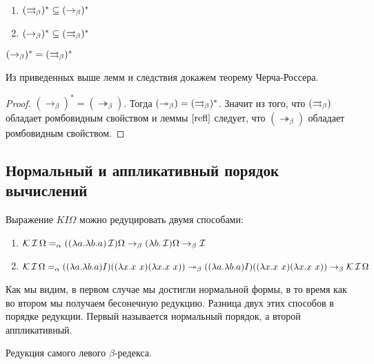 \begin{lemma}
	\
	\begin{enumerate}
		\item $(\rightrightarrows_{\beta} )^{*} \subseteq (\to_{\beta})^{*}$
		\item $(\to_{\beta})^{*} \subseteq (\rightrightarrows_{\beta} )^{*}$
	\end{enumerate}
\end{lemma}

\begin{cons}
	$(\to_{\beta})^{*}=(\rightrightarrows_{\beta} )^{*}$
\end{cons}

Из приведенных выше лемм и следствия докажем теорему Черча-Россера.

\begin{proof}
	$(\to_{\beta})^{*} = (\twoheadrightarrow_{\beta})$. Тогда $(\twoheadrightarrow_{\beta})=(\rightrightarrows_{\beta} )^{*}$. Значит из того, что $(\rightrightarrows_{\beta} )$ обладает ромбовидным свойством и леммы $\ref{refl}$ следует, что $(\twoheadrightarrow_{\beta})$ обладает ромбовидным свойством.
\end{proof}

\subsection{Нормальный и аппликативный порядок вычислений}

\begin{example}
	Выражение $KI\Omega$ можно редуцировать двумя способами:
	\begin{enumerate}
		\item $\operatorname{\mathcal{K}} \operatorname{\mathcal{I}} \Omega =_{\alpha} ((\lambda{}a.\lambda{}b.a) \operatorname{\mathcal{I}}) \Omega \to_{\beta} (\lambda{}b.\operatorname{\mathcal{I}})\Omega  \to_{\beta} \operatorname{\mathcal{I}}$
		\item  $\comb K \comb I \Omega =_{\alpha} ((\lambda{}a.\lambda{}b.a) I)((\lambda{}x.x \ x) (\lambda{}x.x \ x)) \twoheadrightarrow_{\beta} ((\lambda{}a.\lambda{}b.a) I)((\lambda{}x.x \ x) (\lambda{}x.x \ x)) \to_{\beta} \comb K \comb I \Omega $
	\end{enumerate}
	
\end{example}

Как мы видим, в первом случае мы достигли нормальной формы, в то время как во втором мы получаем бесонечную редукцию. Разница двух этих способов в порядке редукции. Первый называется нормальный порядок, а второй аппликативный. 

\begin{definition}
	Редукция самого левого $\beta$-редекса.
\end{definition}

